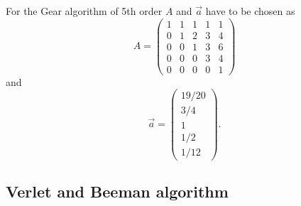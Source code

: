 For the Gear algorithm of 5th order $A$ and $\vec{a}$ have to be chosen as
\begin{displaymath}
A =   \left( 
             \begin{array}{ccccc}
                    1 & 1 & 1 & 1 & 1\\
                    0 & 1 & 2 & 3 & 4\\
                    0 & 0 & 1 & 3 & 6\\
                    0 & 0 & 0 & 3 & 4 \\
                    0 & 0 & 0 & 0 & 1
              \end{array}
             \right)
\end{displaymath}
and
\begin{displaymath}
  \vec{a} = \left( 
                 \begin{array}{c}
                   19/20 \\
                    3/4 \\
                    1 \\
                    1/2 \\
                    1/12
                  \end{array}
                    \right).
\end{displaymath}

\subsection{Verlet and Beeman algorithm}
